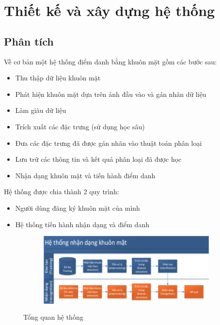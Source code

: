 \chapter{Thiết kế và xây dựng hệ thống}
\label{cha:chap3}

\section{Phân tích}
Về cơ bản một hệ thống điểm danh bằng khuôn mặt gồm các bước sau:
\begin{itemize}
    \item Thu thập dữ liệu khuôn mặt
    \item Phát hiện khuôn mặt dựa trên ảnh đầu vào và gán nhãn dữ liệu
    \item Làm giàu dữ liệu
    \item Trích xuất các đặc trưng (sử dụng học sâu)
    \item Đưa các đặc trưng đã được gán nhãn vào thuật toán phân loại
    \item Lưu trữ các thông tin và kết quả phân loại đã được học
    \item Nhận dạng khuôn mặt và tiến hành điểm danh
\end{itemize}

Hệ thống được chia thành 2 quy trình:
\begin{itemize}
    \item Người dùng đăng ký khuôn mặt của mình
    \item Hệ thống tíến hành nhận dạng và điểm danh
\end{itemize}

\begin{figure}
    \begin{subfigure}{1.\textwidth}
        \includegraphics[width=1.\linewidth]{Chapters/items/chap3_1.jpg}
        \label{fig:chap3_1}
    \end{subfigure}
    \caption{Tổng quan hệ thống}
\end{figure}


